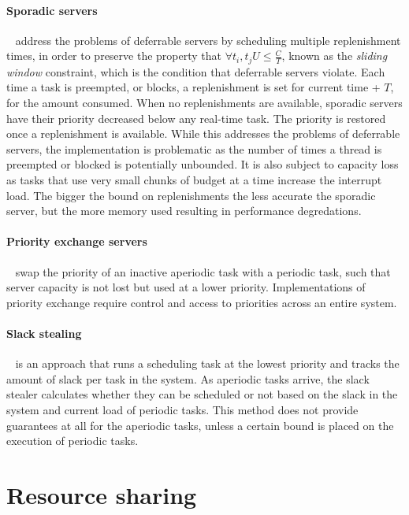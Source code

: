\paragraph{Sporadic servers}~\citep{Sprunt_SL_89a}\label{p:sporadic} address the problems of deferrable servers by scheduling multiple replenishment times, in order to preserve the property that $\forall t_{i}, t_{j} U \leq \frac{C}{T}$, known as the \emph{sliding window} constraint, which is the condition that deferrable servers violate.
Each time a task is preempted, or blocks, a replenishment is set for current time + $T$, for the amount consumed.
When no replenishments are available, sporadic servers have their priority decreased below any real-time task. 
The priority is restored once a replenishment is available.
While this addresses the problems of deferrable servers, the implementation is problematic as the number of times a thread is preempted or blocked is potentially unbounded.
It is also subject to capacity loss as tasks that use very small chunks of budget at a time increase the interrupt load.
The bigger the bound on replenishments the less accurate the sporadic server, but the more memory used resulting in performance degredations.

\paragraph{Priority exchange servers}~\citep{Sprunt_SL_89a} swap the priority of an inactive aperiodic task with a periodic task, such that server capacity is not lost but used at a lower priority.
Implementations of priority exchange require control and access to priorities across an entire system.

\paragraph{Slack stealing}~\citep{Ramos_Thuel_Lehoczky_93} is an approach that runs a scheduling task at the lowest priority and tracks the amount of slack per task in the system.
As aperiodic tasks arrive, the slack stealer calculates whether they can be scheduled or not based on the slack in the system and current load of periodic tasks.
This method does not provide guarantees at all for the aperiodic tasks, unless a certain bound is placed on the execution of periodic tasks.

\section{Resource sharing}

